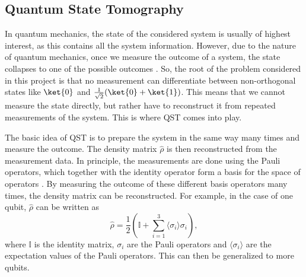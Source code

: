 \documentclass[a4paper,12pt]{article}
\begin{document}
\subsection{Quantum State Tomography}
In quantum mechanics, the state of the considered system is usually of highest interest, as this contains all the system information. However, due to the nature of quantum mechanics, once we measure the outcome of a system, the state collapses to one of the possible outcomes \cite{nielsen_chuang}. So, the root of the problem considered in this project is that no measurement can differentiate between non-orthogonal states like $\ket{0}$ and $\frac{1}{\sqrt{2}}(\ket{0} + \ket{1})$. This means that we cannot measure the state directly, but rather have to reconstruct it from repeated measurements of the system. This is where QST comes into play.

The basic idea of QST is to prepare the system in the same way many times and measure the outcome. The density matrix $\hat{\rho}$ is then reconstructed from the measurement data. In principle, the measurements are done using the Pauli operators, which together with the identity operator form a basis for the space of operators \cite{nielsen_chuang}. By measuring the outcome of these different basis operators many times, the density matrix can be reconstructed. For example, in the case of one qubit, $\hat{\rho}$ can be written as
\begin{equation}
    \hat{\rho} = \frac{1}{2}\left(\mathbb{I} + \sum_{i=1}^3 \langle \sigma_i\rangle \sigma_i\right),
\end{equation}
where $\mathbb{I}$ is the identity matrix, $\sigma_i$ are the Pauli operators and $\langle \sigma_i\rangle$ are the expectation values of the Pauli operators. This can then be generalized to more qubits.
\end{document}
